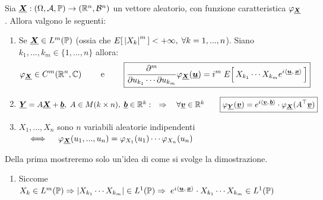 \begin{teorema}
\label{th:12.4}
    Sia $\underline{{\boldsymbol{X}}}: (\Omega, \mathcal{A}, \mathbb{P})\to (\mathbb{R}^n, \mathcal{B}^n)$ un vettore aleatorio, con funzione caratteristica $\varphi_{\underline{{\boldsymbol{X}}}}$. Allora valgono le seguenti:
    \begin{enumerate}
        \item Se $\underline{{\boldsymbol{X}}} \in L^m(\mathbb{P})$ (ossia che $E\!\left[\,\left|X_k\right|^m\,\right]<+\infty, \;\forall k=1, ..., n$). Siano $k_1, ..., k_m\in \{1, ..., n\}$ allora:
        \[\varphi_{\underline{{\boldsymbol{X}}}}\in C^m(\mathbb{R}^n, \mathbb{C})\qquad \text{ e }\qquad \boxed{\frac{\partial^m}{\partial u_{k_1}\cdots \partial u_{k_m}}\varphi_{\underline{{\boldsymbol{X}}}}(\underline{{\boldsymbol{u}}}) = i^m\;E\!\left[\,X_{k_1}\cdots X_{k_m} e^{i\left\langle \underline{{\boldsymbol{u}}},\, \underline{{\boldsymbol{x}}} \right\rangle}\,\right]}\]
        \item $\underline{{\boldsymbol{Y}}} = A\underline{{\boldsymbol{X}}}+\underline{{\boldsymbol{b}}}, \; A\in M(k\times n), \;\underline{{\boldsymbol{b}}}\in \mathbb{R}^k: \quad \Rightarrow \quad \forall \underline{{\boldsymbol{v}}}\in \mathbb{R}^k\qquad \boxed{\varphi_{\underline{{\boldsymbol{Y}}}}(\underline{{\boldsymbol{v}}}) = e^{i\left\langle \underline{{\boldsymbol{v}}},\, \underline{{\boldsymbol{b}}} \right\rangle}\cdot \varphi_{\underline{{\boldsymbol{X}}}}(A^\top\underline{{\boldsymbol{v}}})}$
        \item $X_1, ..., X_n$ sono $n$ variabili aleatorie indipendenti $\quad \iff \quad \varphi_{\underline{{\boldsymbol{X}}}}(u_1, ..., u_n) = \varphi_{X_1}(u_1)\cdots \varphi_{X_n}(u_n)$
    \end{enumerate}
    \begin{dimostrazione}
        Della prima mostreremo solo un'idea di come si svolge la dimostrazione.
        \begin{enumerate}
            \item Siccome $X_k\in L^m(\mathbb{P})\Rightarrow |X_{k_1}\cdots X_{k_m}|\in L^1(\mathbb{P})\Rightarrow\;e^{i\left\langle \underline{{\boldsymbol{u}}},\, \underline{{\boldsymbol{x}}} \right\rangle}\cdot X_{k_1}\cdots X_{k_m} \in L^1(\mathbb{P})$


\end{enumerate}
\end{dimostrazione}
\end{teorema}
